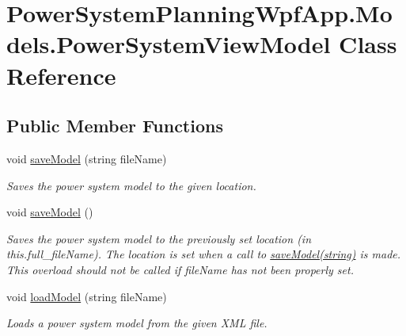 \hypertarget{class_power_system_planning_wpf_app_1_1_models_1_1_power_system_view_model}{}\section{Power\+System\+Planning\+Wpf\+App.\+Models.\+Power\+System\+View\+Model Class Reference}
\label{class_power_system_planning_wpf_app_1_1_models_1_1_power_system_view_model}
\subsection*{Public Member Functions}
\begin{DoxyCompactItemize}
\item 
void \hyperlink{class_power_system_planning_wpf_app_1_1_models_1_1_power_system_view_model_abda279482100378e9dba53ad4f741c1c}{save\+Model} (string file\+Name)
\begin{DoxyCompactList}\small\item\em Saves the power system model to the given location. \end{DoxyCompactList}\item 
void \hyperlink{class_power_system_planning_wpf_app_1_1_models_1_1_power_system_view_model_addc9f5e96c8838056a1abe5d619b9d7e}{save\+Model} ()
\begin{DoxyCompactList}\small\item\em Saves the power system model to the previously set location (in \textquotesingle{}this.\+full\+\_\+file\+Name\textquotesingle{}). The location is set when a call to \hyperlink{class_power_system_planning_wpf_app_1_1_models_1_1_power_system_view_model_abda279482100378e9dba53ad4f741c1c}{save\+Model(string)} is made. This overload should not be called if file\+Name has not been properly set. \end{DoxyCompactList}\item 
void \hyperlink{class_power_system_planning_wpf_app_1_1_models_1_1_power_system_view_model_aa64bb0e541cc576eb77355958376915e}{load\+Model} (string file\+Name)
\begin{DoxyCompactList}\small\item\em Loads a power system model from the given X\+ML file. \end{DoxyCompactList}\end{DoxyCompactItemize}

